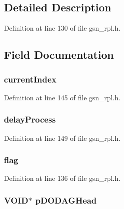 \subsection{Detailed Description}


Definition at line 130 of file gsn\_\-rpl.h.



\subsection{Field Documentation}
\hypertarget{a00192_ae5816df60fa5aa70b963fcd4df337522}{
\subsubsection[{currentIndex}]{ {\bf currentIndex}}}
\label{a00192_ae5816df60fa5aa70b963fcd4df337522}


Definition at line 145 of file gsn\_\-rpl.h.

\hypertarget{a00192_acd423b16a3f71c783b514c886237d2c1}{
\subsubsection[{delayProcess}]{ {\bf delayProcess}}}
\label{a00192_acd423b16a3f71c783b514c886237d2c1}


Definition at line 149 of file gsn\_\-rpl.h.

\hypertarget{a00192_a5f8f2b25ad9606164f92acb3cfa6b40b}{
\subsubsection[{flag}]{ {\bf flag}}}
\label{a00192_a5f8f2b25ad9606164f92acb3cfa6b40b}


Definition at line 136 of file gsn\_\-rpl.h.

\hypertarget{a00192_a84425b28ccce31b39199fdc85ef89e5c}{
\subsubsection[{pDODAGHead}]{\setlength{\rightskip}{0pt plus 5cm}VOID$\ast$ {\bf pDODAGHead}}}
\label{a00192_a84425b28ccce31b39199fdc85ef89e5c}


